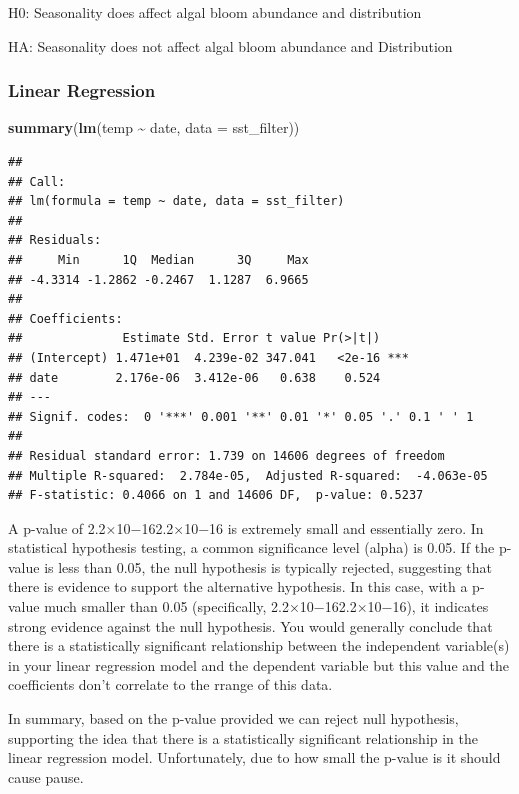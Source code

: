 \documentclass[
]{article}
\newenvironment{Shaded}{\begin{snugshade}}{\end{snugshade}}
\newcommand{\AttributeTok}[1]{\textcolor[rgb]{0.13,0.29,0.53}{#1}}
\newcommand{\FunctionTok}[1]{\textcolor[rgb]{0.13,0.29,0.53}{\textbf{#1}}}
\newcommand{\NormalTok}[1]{#1}
\newcommand{\SpecialCharTok}[1]{\textcolor[rgb]{0.81,0.36,0.00}{\textbf{#1}}}
\begin{document}
H0: Seasonality does affect algal bloom abundance and distribution

HA: Seasonality does not affect algal bloom abundance and Distribution

\hypertarget{linear-regression}{%
\subsubsection{Linear Regression}\label{linear-regression}}

\begin{Shaded}
\begin{Highlighting}[]
\FunctionTok{summary}\NormalTok{(}\FunctionTok{lm}\NormalTok{(temp }\SpecialCharTok{\textasciitilde{}}\NormalTok{ date, }\AttributeTok{data =}\NormalTok{ sst\_filter))}
\end{Highlighting}
\end{Shaded}

\begin{verbatim}
## 
## Call:
## lm(formula = temp ~ date, data = sst_filter)
## 
## Residuals:
##     Min      1Q  Median      3Q     Max 
## -4.3314 -1.2862 -0.2467  1.1287  6.9665 
## 
## Coefficients:
##              Estimate Std. Error t value Pr(>|t|)    
## (Intercept) 1.471e+01  4.239e-02 347.041   <2e-16 ***
## date        2.176e-06  3.412e-06   0.638    0.524    
## ---
## Signif. codes:  0 '***' 0.001 '**' 0.01 '*' 0.05 '.' 0.1 ' ' 1
## 
## Residual standard error: 1.739 on 14606 degrees of freedom
## Multiple R-squared:  2.784e-05,  Adjusted R-squared:  -4.063e-05 
## F-statistic: 0.4066 on 1 and 14606 DF,  p-value: 0.5237
\end{verbatim}

A p-value of 2.2×10−162.2×10−16 is extremely small and essentially zero.
In statistical hypothesis testing, a common significance level (alpha)
is 0.05. If the p-value is less than 0.05, the null hypothesis is
typically rejected, suggesting that there is evidence to support the
alternative hypothesis. In this case, with a p-value much smaller than
0.05 (specifically, 2.2×10−162.2×10−16), it indicates strong evidence
against the null hypothesis. You would generally conclude that there is
a statistically significant relationship between the independent
variable(s) in your linear regression model and the dependent variable
but this value and the coefficients don't correlate to the rrange of
this data.

In summary, based on the p-value provided we can reject null hypothesis,
supporting the idea that there is a statistically significant
relationship in the linear regression model. Unfortunately, due to how
small the p-value is it should cause pause.
\end{document}
